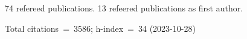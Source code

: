 74 refereed publications. 13 refeered publications as first author.

Total citations~=~3586; h-index~=~34 (2023-10-28)